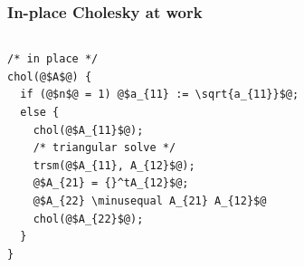 \documentclass[12pt,dvipdfmx]{beamer}
\newcommand{\minusequal}{\mbox{\tt\ -= }}
\begin{document}
\begin{frame}[fragile]
\frametitle{In-place Cholesky at work}

\begin{columns}[t]
\begin{column}{0.4\textwidth}
\begin{lstlisting}[basicstyle=\scriptsize]
/* in place */
chol(@$A$@) {
  if (@$n$@ = 1) @$a_{11} := \sqrt{a_{11}}$@;
  else {
    chol(@$A_{11}$@);
    /* triangular solve */
    trsm(@$A_{11}, A_{12}$@);
    @$A_{21} = {}^tA_{12}$@;
    @$A_{22} \minusequal A_{21} A_{12}$@
    chol(@$A_{22}$@);
  }
}
\end{lstlisting}
\end{column}
\begin{column}{0.6\textwidth}
\begin{center}
\def\svgwidth{\textwidth}
%
\only<2>{}%
\only<3>{}%
\only<4>{}%
\only<5>{}%
\end{center}
\end{column}
\end{columns}
\end{frame}
\end{document}
